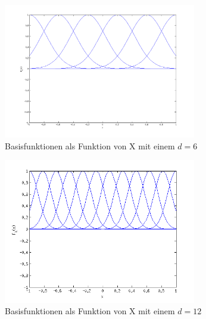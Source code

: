 \begin{figure}[h!]
\begin{center}
 \includegraphics[width=0.75\textwidth]{./figures/RBF_6}
 \caption[Basisfunktionen als Funktion von X (d=6)]{Basisfunktionen als Funktion von X mit einem $d=6$}
\label{fig:RBF_6}
\end{center}
\end{figure}

\begin{figure}[h!]
\begin{center}
 \includegraphics[width=0.75\textwidth]{./figures/RBF_12}
 \caption[Basisfunktionen als Funktion von X, d=12]{Basisfunktionen als Funktion von X mit einem $d=12$}
\label{fig:RBF_12}
\end{center}
\end{figure}



